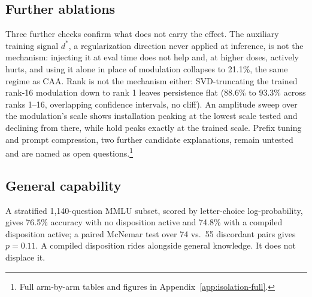 \subsection{Further ablations}
\label{sec:isolation-rank}

Three further checks confirm what does not carry the effect. The auxiliary training
signal \(d^*\), a regularization direction never applied at inference, is not the
mechanism: injecting it at eval time does not help and, at higher doses, actively
hurts, and using it alone in place of modulation collapses to 21.1\%, the same regime
as CAA. Rank is not the mechanism either: SVD-truncating the trained
rank-16 modulation down to rank 1 leaves persistence flat (88.6\% to 93.3\% across
ranks 1--16, overlapping confidence intervals, no cliff). An
amplitude sweep over the modulation's scale shows installation peaking at the lowest
scale tested and declining from there, while hold peaks exactly at the trained
scale. Prefix tuning and prompt compression, two further candidate
explanations, remain untested and are named as open questions.\footnote{Full arm-by-arm
tables and figures in Appendix~\ref{app:isolation-full}.}
\label{sec:isolation-amplitude}
\label{sec:isolation-prefix}
\label{sec:isolation-compression}

\subsection{General capability}
\label{sec:isolation-mmlu}

A stratified 1,140-question MMLU subset, scored by letter-choice log-probability, gives
76.5\% accuracy with no disposition active and 74.8\% with a compiled disposition
active; a paired McNemar test over 74 vs.\ 55 discordant pairs gives \(p = 0.11\). A
compiled disposition rides alongside general knowledge. It does not displace it.
\fi

